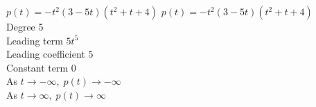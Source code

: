 {$p(t) = -t^2(3 - 5t)(t^{2} + t + 4)$}
{$p(t) = -t^2(3 - 5t)(t^{2} + t + 4)$\\
Degree 5 \\
Leading term $5t^{5}$\\
Leading coefficient $5$\\
Constant term $0$\\
As $t \rightarrow -\infty, \; p(t) \rightarrow -\infty$\\
As $t \rightarrow \infty, \; p(t) \rightarrow \infty$}